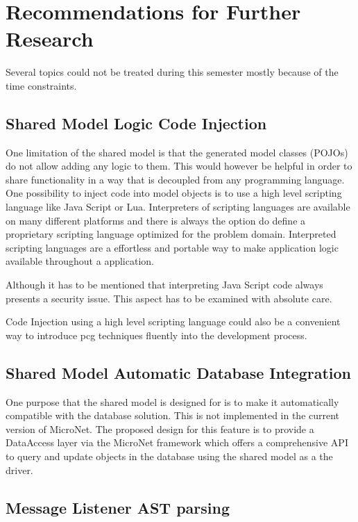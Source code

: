 \section{Recommendations for Further Research}

Several topics could not be treated during this semester mostly because of the
time constraints.

\subsection{Shared Model Logic Code Injection}
\label{sub:model_code_injection}

One limitation of the shared model is that the generated model classes (POJOs)
do not allow adding any logic to them. This would however be helpful in order to
share functionality in a way that is decoupled from any programming language.
One possibility to inject code into model objects is to use a high level
scripting language like Java Script or Lua. Interpreters of scripting languages
are available on many different platforms and there is always the option do
define a proprietary scripting language optimized for the problem domain.
Interpreted scripting languages are a effortless and portable way to make
application logic available throughout a \ms{} application.

Although it has to be mentioned that interpreting Java Script code always
presents a security issue. This aspect has to be examined with absolute care.

Code Injection using a high level scripting language could also be a convenient
way to introduce \gls{pcg} techniques fluently into the \og{} development
process.

\subsection{Shared Model Automatic Database Integration}

One purpose that the shared model is designed for is to make it automatically
compatible with the database solution. This is not implemented in the current
version of MicroNet. The proposed design for this feature is to provide a
DataAccess layer via the MicroNet framework which offers a comprehensive API to
query and update objects in the database using the shared model as a the driver.

\subsection{Message Listener AST parsing}

